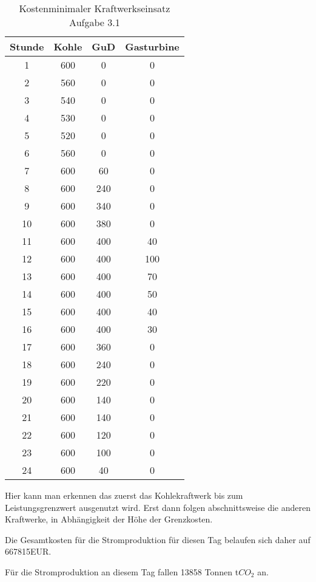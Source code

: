 \documentclass{eegreport}
\begin{document}
\begin{table}[h]
\begin{center}
\begin{tabular}{|c|c|c|c|}
\hline 
\textbf{Stunde} & \textbf{Kohle} & \textbf{GuD} & \textbf{Gasturbine} \\ 
\hline 
1 & 600 & 0 & 0 \\ 
\hline 
2 & 560 & 0 & 0 \\ 
\hline 
3 & 540 & 0 & 0 \\ 
\hline 
4 & 530 & 0 & 0 \\ 
\hline 
5 & 520 & 0 & 0 \\ 
\hline 
6 & 560 & 0 & 0 \\ 
\hline 
7 & 600 & 60 & 0 \\ 
\hline 
8 & 600 & 240 & 0 \\ 
\hline 
9 & 600 & 340 & 0 \\ 
\hline 
10 & 600 & 380 & 0 \\ 
\hline 
11 & 600 & 400 & 40 \\ 
\hline 
12 & 600 & 400 & 100 \\ 
\hline 
13 & 600 & 400 & 70 \\ 
\hline 
14 & 600 & 400 & 50 \\ 
\hline 
15 & 600 & 400 & 40 \\ 
\hline 
16 & 600 & 400 & 30 \\ 
\hline 
17 & 600 & 360 & 0 \\ 
\hline 
18 & 600 & 240 & 0 \\ 
\hline 
19 & 600 & 220 & 0 \\ 
\hline 
20 & 600 & 140 & 0 \\ 
\hline 
21 & 600 & 140 & 0 \\ 
\hline 
22 & 600 & 120 & 0 \\ 
\hline 
23 & 600 & 100 & 0 \\ 
\hline 
24 & 600 & 40 & 0 \\ 
\hline 
\end{tabular} 
\end{center}
\caption{Kostenminimaler Kraftwerkseinsatz Aufgabe 3.1}
\label{eosa}
\end{table}
Hier kann man erkennen das zuerst das Kohlekraftwerk bis zum Leistungsgrenzwert ausgenutzt wird. Erst dann folgen abschnittsweise die anderen Kraftwerke, in Abhängigkeit der Höhe der Grenzkosten.

Die Gesamtkosten für die Stromproduktion für diesen Tag belaufen sich daher auf 667815EUR.

Für die Stromproduktion an diesem Tag fallen 13858 Tonnen t$CO_2$ an.
\end{document}
